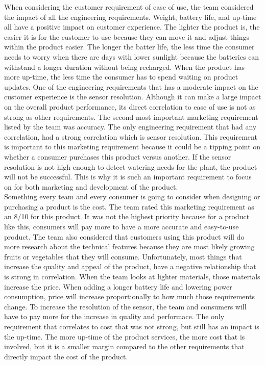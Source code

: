 When considering the customer requirement of ease of use, the team considered the impact of all the engineering requirements. Weight, battery life, and up-time all have a positive impact on customer experience. The lighter the product is, the easier it is for the customer to use because they can move it and adjust things within the product easier. The longer the batter life, the less time the consumer needs to worry when there are days with lower sunlight because the batteries can withstand a longer duration without being recharged. When the product has more up-time, the less time the consumer has to spend waiting on product updates. One of the engineering requirements that has a moderate impact on the customer experience is the sensor resolution. Although it can make a large impact on the overall product performance, its direct correlation to ease of use is not as strong as other requirements. The second most important marketing requirement listed by the team was accuracy. The only engineering requirement that had any correlation, had a strong correlation which is sensor resolution. This requirement is important to this marketing requirement because it could be a tipping point on whether a consumer purchases this product versus another. If the sensor resolution is not high enough to detect watering needs for the plant, the product will not be successful. This is why it is such an important requirement to focus on for both marketing and development of the product.\\

Something every team and every consumer is going to consider when designing or purchasing a product is the cost. The team rated this marketing requirement as an 8/10 for this product. It was not the highest priority because for a product like this, consumers will pay more to have a more accurate and easy-to-use product. The team also considered that customers using this product will do more research about the technical features because they are most likely growing fruits or vegetables that they will consume. Unfortunately, most things that increase the quality and appeal of the product, have a negative relationship that is strong in correlation. When the team looks at lighter materials, those materials increase the price. When adding a longer battery life and lowering power consumption, price will increase proportionally to how much those requirements change. To increase the resolution of the sensor, the team and consumers will have to pay more for the increase in quality and performace. The only requirement that  correlates to cost that was not strong, but still has an impact is the up-time. The more up-time of the product services, the more cost that is involved, but it is a smaller margin compared to the other requirements that directly impact the cost of the product. \\

